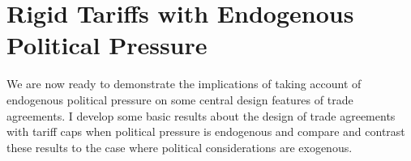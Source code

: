 \documentclass[12pt,titlepage]{article}
\newcommand{\ga}{\gamma}
\begin{document}

\section{Rigid Tariffs with Endogenous Political Pressure}
\label{sec:rigid}
We are now ready to demonstrate the implications of taking account of endogenous political pressure on some central design features of trade agreements. I develop some basic results about the design of trade agreements with tariff caps when political pressure is endogenous and compare and contrast these results to the case where political considerations are exogenous.
\end{document}
